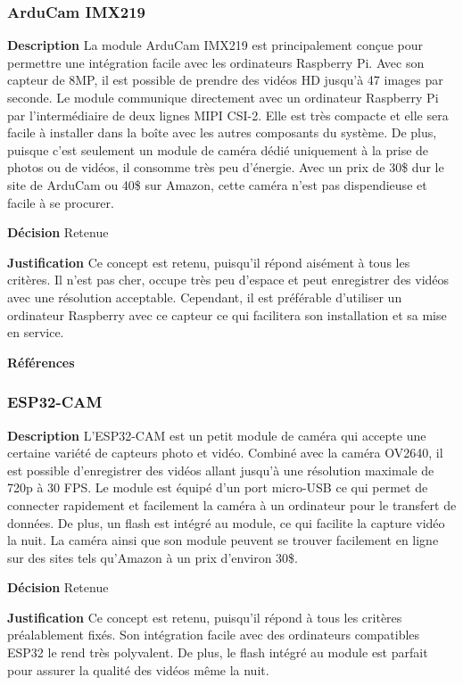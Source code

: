 \subsubsection{ArduCam IMX219}
\noindent\textbf{Description} La module ArduCam IMX219 est principalement conçue pour permettre une intégration facile avec les ordinateurs Raspberry Pi. Avec son capteur de 8MP, il est possible de prendre des vidéos HD jusqu'à 47 images par seconde. Le module communique directement avec un ordinateur Raspberry Pi par l'intermédiaire de deux lignes MIPI CSI-2. Elle est très compacte et elle sera facile à installer dans la boîte avec les autres composants du système. De plus, puisque c'est seulement un module de caméra dédié uniquement à la prise de photos ou de vidéos, il consomme très peu d'énergie. Avec un prix de 30\$ dur le site de ArduCam ou 40\$ sur Amazon, cette caméra n'est pas dispendieuse et facile à se procurer.

\noindent\textbf{Décision} Retenue

\noindent\textbf{Justification} Ce concept est retenu, puisqu'il répond aisément à tous les critères. Il n'est pas cher, occupe très peu d'espace et peut enregistrer des vidéos avec une résolution acceptable. Cependant, il est préférable d'utiliser un ordinateur Raspberry avec ce capteur ce qui facilitera son installation et sa mise en service.

\noindent\textbf{Références} 
\cite{ArduCam1}
\cite{ArduCam2}

\subsubsection{ESP32-CAM}
\noindent\textbf{Description} L'ESP32-CAM est un petit module de caméra qui accepte une certaine variété de capteurs photo et vidéo. Combiné avec la caméra OV2640, il est possible d'enregistrer des vidéos allant jusqu'à une résolution maximale de 720p à 30 FPS. Le module est équipé d'un port micro-USB ce qui permet de connecter rapidement et facilement la caméra à un ordinateur pour le transfert de données. De plus, un flash est intégré au module, ce qui facilite la capture vidéo la nuit. La caméra ainsi que son module peuvent se trouver facilement en ligne sur des sites tels qu'Amazon à un prix d'environ 30\$.

\noindent\textbf{Décision} Retenue

\noindent\textbf{Justification} Ce concept est retenu, puisqu'il répond à tous les critères préalablement fixés. Son intégration facile avec des ordinateurs compatibles ESP32 le rend très polyvalent. De plus, le flash intégré au module est parfait pour assurer la qualité des vidéos même la nuit.

